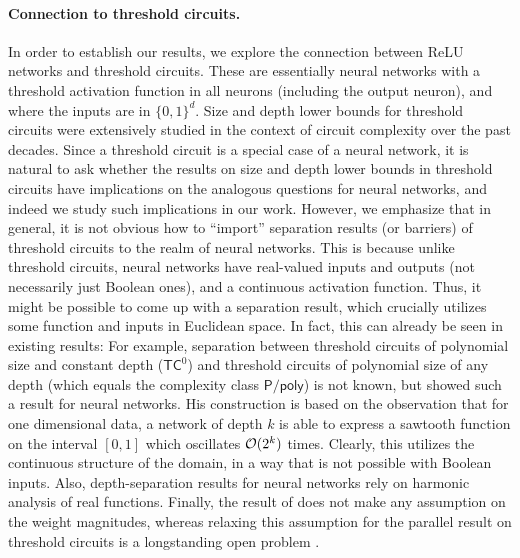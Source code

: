 \documentclass[11pt]{article}
\newcommand{\co}{{\cal O}}
\newcommand{\TC}{\textsf{TC}}
\newcommand{\Ppoly}{\textsf{P/poly}}
\begin{document}
\paragraph{Connection to threshold circuits.}
In order to establish our results, we explore the connection between ReLU networks and threshold circuits. These are essentially neural networks with a threshold activation function in all neurons (including the output neuron), and where the inputs are in $\{0,1\}^d$. Size and depth lower bounds for threshold circuits were extensively studied in the context of circuit complexity over the past decades.
Since a threshold circuit is a special case of a neural network, it is natural to ask whether the results on size and depth lower bounds in threshold circuits have implications on the analogous questions for neural networks, and indeed we study such implications in our work. However, we emphasize that in general, it is not obvious how to ``import'' separation results (or barriers) of threshold circuits to the realm of neural networks. This is because unlike threshold circuits, neural networks have real-valued inputs and outputs (not necessarily just Boolean ones), and a continuous activation function. Thus, it might be possible to come up with a separation result, which crucially utilizes some function and inputs in Euclidean space. In fact, this can already be seen in existing results: For example, separation between threshold circuits of polynomial size and constant depth ($\TC^0$) and threshold circuits of polynomial size of any depth (which equals the complexity class $\Ppoly$) is not known, but \cite{telgarsky2016benefits} showed such a result for neural networks. His construction is based on the observation that for one dimensional data, a network of depth $k$ is able to express a sawtooth function on the interval $[0,1]$ which oscillates $\co(2^k)$ times. Clearly, this utilizes the continuous structure of the domain, in a way that is not possible with Boolean inputs. Also, depth-separation results for neural networks \citep{eldan2016power,daniely2017depth} rely on harmonic analysis of real functions. Finally, the result of \cite{eldan2016power} does not make any assumption on the weight magnitudes, whereas relaxing this assumption for the parallel result on threshold circuits is a longstanding open problem \citep{razborov1992small}.

\end{document}
